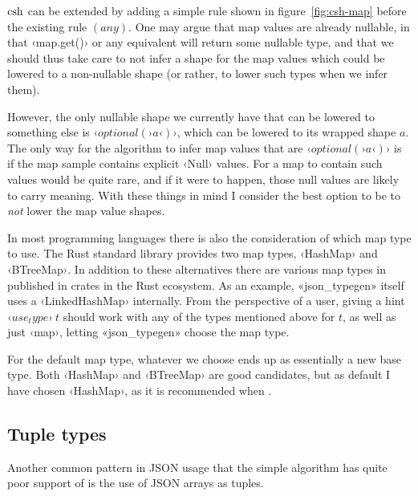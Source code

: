 $\operatorname{csh}$ can be extended by adding a simple rule shown in figure~\ref{fig:csh-map} before the existing rule $(any)$. One may argue that map values are already nullable, in that ‹map.get()› or any equivalent will return some nullable type, and that we should thus take care to not infer a shape for the map values which could be lowered to a non-nullable shape (or rather, to lower such types when we infer them).

However, the only nullable shape we currently have that can be lowered to something else is $‹optional(›a‹)›$, which can be lowered to its wrapped shape $a$. The only way for the algorithm to infer map values that are $‹optional(›a‹)›$ is if the map sample contains explicit ‹Null› values. For a map to contain such values would be quite rare, and if it were to happen, those null values are likely to carry meaning. With these things in mind I consider the best option to be to \emph{not} lower the map value shapes.

In most programming languages there is also the consideration of which map type to use. The Rust standard library provides two map types, ‹HashMap› and ‹BTreeMap›. In addition to these alternatives there are various map types in published in crates in the Rust ecosystem. As an example, «json_typegen» itself uses a ‹LinkedHashMap› internally. From the perspective of a user, giving a hint $‹use_type›\ t$ should work with any of the types mentioned above for $t$, as well as just ‹map›, letting «json_typegen» choose the map type.

For the default map type, whatever we choose ends up as essentially a new base type. Both ‹HashMap› and ‹BTreeMap› are good candidates, but as default I have chosen ‹HashMap›, as it is recommended when \cite[std::collections]{rust-std-docs}.



\subsection{Tuple types}
\label{sec:ext-tuples}

Another common pattern in JSON usage that the simple algorithm has quite poor support of is the use of JSON arrays as tuples.


